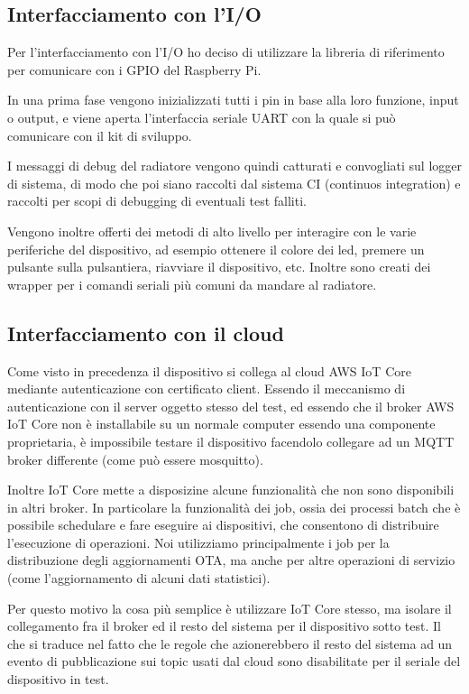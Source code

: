 \documentclass[12pt,a4paper,twoside,titlepage]{book}
\begin{document}
\subsection{Interfacciamento con l'I/O}

Per l'interfacciamento con l'I/O ho deciso di utilizzare la libreria di riferimento
per comunicare con i GPIO del Raspberry Pi.

In una prima fase vengono inizializzati tutti i pin in base alla loro funzione, input
o output, e viene aperta l'interfaccia seriale UART con la quale si può comunicare con
il kit di sviluppo.

I messaggi di debug del radiatore vengono quindi catturati e convogliati sul logger
di sistema, di modo che poi siano raccolti dal sistema CI (continuos integration)
e raccolti per scopi di debugging di eventuali test falliti.

Vengono inoltre offerti dei metodi di alto livello per interagire con le varie
periferiche del dispositivo, ad esempio ottenere il colore dei led, premere un
pulsante sulla pulsantiera, riavviare il dispositivo, etc.
Inoltre sono creati dei wrapper per i comandi seriali più comuni da mandare al
radiatore.

\subsection{Interfacciamento con il cloud}

Come visto in precedenza il dispositivo si collega al cloud AWS IoT Core mediante
autenticazione con certificato client. Essendo il meccanismo di autenticazione con il
server oggetto stesso del test, ed essendo che il broker AWS IoT Core non è installabile
su un normale computer essendo una componente proprietaria, è impossibile testare il
dispositivo facendolo collegare ad un MQTT broker differente (come può essere mosquitto).

Inoltre IoT Core mette a disposizine alcune funzionalità che non sono disponibili in
altri broker. In particolare la funzionalità dei job, ossia dei processi batch che è
possibile schedulare e fare eseguire ai dispositivi, che consentono di distribuire l'esecuzione
di operazioni. Noi utilizziamo principalmente i job per la distribuzione degli aggiornamenti OTA,
ma anche per altre operazioni di servizio (come l'aggiornamento di alcuni dati statistici).

Per questo motivo la cosa più semplice è utilizzare IoT Core stesso, ma isolare il collegamento
fra il broker ed il resto del sistema per il dispositivo sotto test. Il che si traduce nel
fatto che le regole che azionerebbero il resto del sistema ad un evento di pubblicazione
sui topic usati dal cloud sono disabilitate per il seriale del dispositivo in test.
\end{document}
